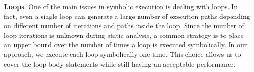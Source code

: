 
\noindent
\textbf{Loops}. One of the main issues in symbolic execution is dealing with loops. In fact, even a single loop can generate a large number of execution paths depending on different number of iterations and paths inside the loop. Since the number of loop iterations is unknown during static analysis, a common strategy is to place an upper bound over the number of times a loop is executed symbolically. In our approach, we execute each loop symbolically one time. This choice allows us to cover the loop body statements while still having an acceptable performance.













